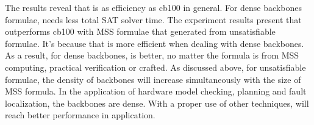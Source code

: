 



The results reveal that \tool is as efficiency as cb100 in general. For dense backbones formulae, \tool needs less total SAT solver time. The experiment results present that \tool outperforms cb100 with MSS formulae that generated from unsatisfiable formulae. It's because that \tool is more efficient when dealing with dense backbones. As a result, for dense backbones, \tool is better, no matter the formula is from MSS computing, practical verification or crafted.
As discussed above, for unsatisfiable formulae, the density of backbones will increase simultaneously with the size of MSS formula. In the application of hardware model checking, planning and fault localization, the backbones are dense. With a proper use of other techniques, \tool will reach better performance in application.




